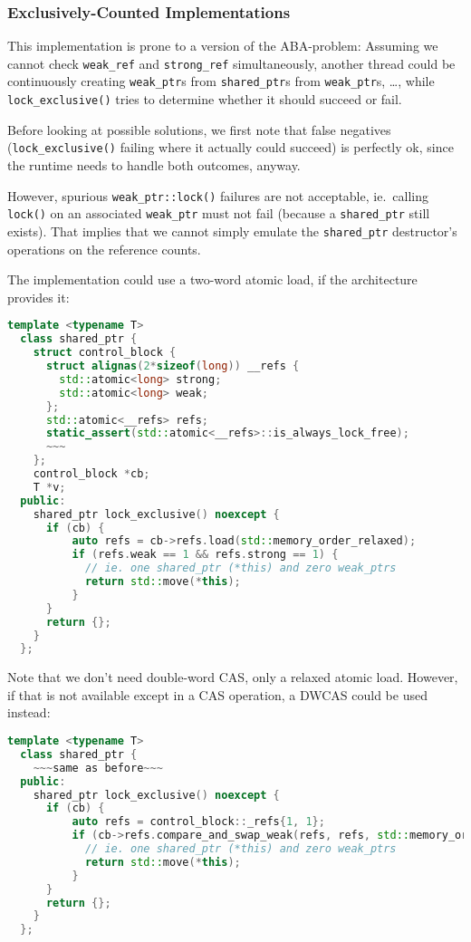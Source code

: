 \documentclass[11pt]{article}
\newcommand{\lockx}{\texttt{lock\_exclusive()}}
\newcommand{\wptr}{\texttt{weak\_ptr}}
\newcommand{\sptr}{\texttt{shared\_ptr}}
\begin{document}
\iffalse

\subsubsection{Exclusively-Counted Implementations}

This implementation is prone to a version of the ABA-problem: Assuming
we cannot check \texttt{weak\_ref} and \texttt{strong\_ref}
simultaneously, another thread could be continuously creating \wptr{}s
from \sptr{}s from \wptr{}s, \ldots, while \lockx{} tries to determine
whether it should succeed or fail.

Before looking at possible solutions, we first note that false
negatives (\lockx{} failing where it actually could succeed) is
perfectly ok, since the runtime needs to handle both outcomes, anyway.

However, spurious \texttt{\wptr::lock()} failures are not acceptable,
ie.\ calling \texttt{lock()} on an associated \wptr{} must not fail
(because a \sptr{} still exists). That implies that we cannot simply
emulate the \sptr{} destructor's operations on the reference counts.

The implementation could use a two-word atomic load, if the
architecture provides it:

\begin{lstlisting}[language=C++,caption={Possible implementation of \lockx{} in an exclusively-counted implementation, using DW relaxed load}]
  template <typename T>
  class shared_ptr {
    struct control_block {
      struct alignas(2*sizeof(long)) __refs {
        std::atomic<long> strong;
        std::atomic<long> weak;
      };
      std::atomic<__refs> refs;
      static_assert(std::atomic<__refs>::is_always_lock_free);
      ~~~
    };
    control_block *cb;
    T *v;
  public:
    shared_ptr lock_exclusive() noexcept {
      if (cb) {
          auto refs = cb->refs.load(std::memory_order_relaxed);
          if (refs.weak == 1 && refs.strong == 1) {
            // ie. one shared_ptr (*this) and zero weak_ptrs
            return std::move(*this);
          }
      }
      return {};
    }
  };
\end{lstlisting}

Note that we don't need double-word CAS, only a relaxed atomic load.
However, if that is not available except in a CAS operation, a DWCAS
could be used instead:

\begin{lstlisting}[language=C++,caption={Possible implementation of \lockx{} in an exclusively-counted implementation, using DWCAS}]
  template <typename T>
  class shared_ptr {
    ~~~same as before~~~
  public:
    shared_ptr lock_exclusive() noexcept {
      if (cb) {
          auto refs = control_block::_refs{1, 1};
          if (cb->refs.compare_and_swap_weak(refs, refs, std::memory_order_relaxed)) {
            // ie. one shared_ptr (*this) and zero weak_ptrs
            return std::move(*this);
          }
      }
      return {};
    }
  };
\end{lstlisting}
\end{document}
